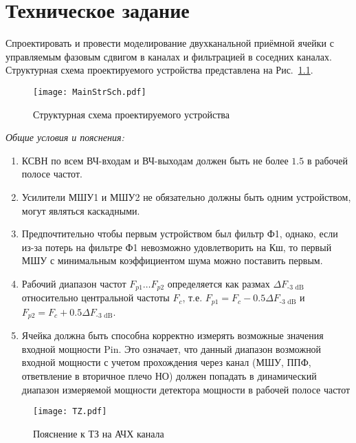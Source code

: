 \chapter{Техническое задание} \label{chap:task}

Спроектировать и провести моделирование двухканальной приёмной ячейки с управляемым фазовым сдвигом в каналах и фильтрацией в соседних каналах.
Структурная схема проектируемого устройства представлена на Рис.~\ref{fig:tor_structure_schematic}.

\begin{figure}[!ht]
	\centering
	\texttt{[image: MainStrSch.pdf]}
	\caption{Структурная схема проектируемого устройства}%
	\label{fig:tor_structure_schematic}
\end{figure}

\textit{Общие условия и пояснения:}
\begin{enumerate}
	\item
	КСВН по всем ВЧ-входам и ВЧ-выходам должен быть не более $1.5$ в рабочей полосе частот.
	\item
	Усилители МШУ1 и МШУ2 не обязательно должны быть одним устройством, могут являться каскадными.
	\item
	Предпочтительно чтобы первым устройством был фильтр Ф1, однако, если из-за потерь на фильтре Ф1 невозможно удовлетворить на Кш, то первый МШУ с минимальным коэффициентом шума можно поставить первым.
	\item
	Рабочий диапазон частот $F_{p1} \ldots F_{p2}$ определяется как размах $\Delta F_\text{-3~dB}$ относительно центральной частоты $F_c$, т.е. $F_{p1} = F_c - 0.5 \Delta F_\text{-3~dB}$ и $F_{p2} = F_c + 0.5 \Delta F_\text{-3~dB}$.
	\item
	Ячейка должна быть способна корректно измерять возможные значения входной мощности Pin. Это означает, что данный диапазон возможной входной мощности с учетом прохождения через канал (МШУ, ППФ, ответвление в вторичное плечо НО) должен попадать в динамический диапазон измеряемой мощности детектора мощности в рабочей полосе частот
\end{enumerate}

\begin{figure}[!ht]
	\centering
	\texttt{[image: TZ.pdf]}
	\caption{Пояснение к ТЗ на АЧХ канала}%
	\label{fig:tor_response}
\end{figure}



